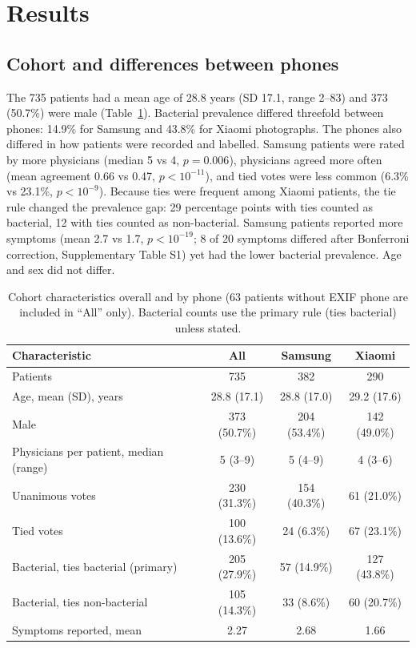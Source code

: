 \documentclass[preprint,12pt]{elsarticle}
\begin{document}
\section{Results}
\label{sec:results}

\subsection{Cohort and differences between phones}

The 735 patients had a mean age of 28.8 years (SD 17.1, range 2--83) and 373 (50.7\%) were male (Table~\ref{tab:cohort}). Bacterial prevalence differed threefold between phones: 14.9\% for Samsung and 43.8\% for Xiaomi photographs. The phones also differed in how patients were recorded and labelled. Samsung patients were rated by more physicians (median 5 vs 4, $p = 0.006$), physicians agreed more often (mean agreement 0.66 vs 0.47, $p < 10^{-11}$), and tied votes were less common (6.3\% vs 23.1\%, $p < 10^{-9}$). Because ties were frequent among Xiaomi patients, the tie rule changed the prevalence gap: 29 percentage points with ties counted as bacterial, 12 with ties counted as non-bacterial. Samsung patients reported more symptoms (mean 2.7 vs 1.7, $p < 10^{-19}$; 8 of 20 symptoms differed after Bonferroni correction, Supplementary Table S1) yet had the lower bacterial prevalence. Age and sex did not differ.

\begin{table}[!htbp]
\centering
\footnotesize
\caption{Cohort characteristics overall and by phone (63 patients without EXIF phone are included in ``All'' only). Bacterial counts use the primary rule (ties bacterial) unless stated.}
\label{tab:cohort}
\setlength{\tabcolsep}{4pt}
\begin{tabular}{@{}>{\raggedright\arraybackslash}p{5.2cm}ccc@{}}
\toprule
Characteristic & All & Samsung & Xiaomi \\
\midrule
Patients & 735 & 382 & 290 \\
Age, mean (SD), years & 28.8 (17.1) & 28.8 (17.0) & 29.2 (17.6) \\
Male & 373 (50.7\%) & 204 (53.4\%) & 142 (49.0\%) \\
Physicians per patient, median (range) & 5 (3--9) & 5 (4--9) & 4 (3--6) \\
Unanimous votes & 230 (31.3\%) & 154 (40.3\%) & 61 (21.0\%) \\
Tied votes & 100 (13.6\%) & 24 (6.3\%) & 67 (23.1\%) \\
Bacterial, ties bacterial (primary) & 205 (27.9\%) & 57 (14.9\%) & 127 (43.8\%) \\
Bacterial, ties non-bacterial & 105 (14.3\%) & 33 (8.6\%) & 60 (20.7\%) \\
Symptoms reported, mean & 2.27 & 2.68 & 1.66 \\
\bottomrule
\end{tabular}
\end{table}
\end{document}

